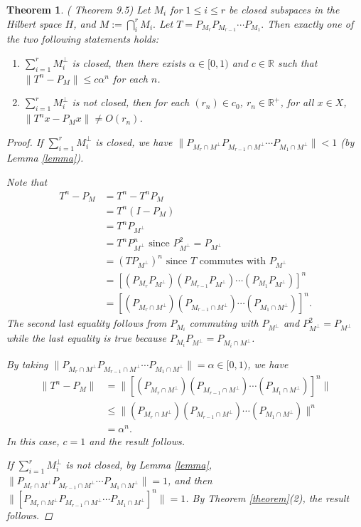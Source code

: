 \documentclass[11pt, a4paper]{amsart}
\newtheorem{theorem}{Theorem}
\begin{document}
\begin{theorem}(\cite{DH15} Theorem 9.5)
Let $M_i$ for $1\leq i\leq r$ be closed subspaces in the Hilbert space $H$, and $M:=\bigcap_{i}^r M_i.$ Let $T=P_{M_r}P_{M_{r-1}}\cdots P_{M_1}.$ Then exactly one of the two following statements holds:
\begin{enumerate}
\item $\sum_{i=1}^r M_{i}^{\perp}$ is closed, then there exists $\alpha\in [0,1)$ and $c\in \mathbb{R}$ such that $\|T^n-P_{M}\|\leq c\alpha^n$ for each $n$.\\
\item $\sum_{i=1}^r M_{i}^{\perp}$ is not closed, then for each $(r_n)\in c_0$, $r_n\in\mathbb{R}^{+}$, for all $x\in X$, $\|T^n x-P_{M}x\|\neq O(r_n)$.
\end{enumerate}
\begin{proof}

If $\sum_{i=1}^r M_{i}^{\perp}$ is closed, we have $\|P_{M_r\cap M^{\perp}}P_{M_{r-1}\cap M^{\perp}}\cdots P_{M_1\cap M^{\perp}}\|<1$ (by \emph{Lemma \ref{lemma}}).

Note that 
\begin{align*}
T^n-P_{M}&=T^n-T^nP_M \\
{}&=T^n(I-P_{M})\\
{}&=T^n P_{M^{\perp}}\\
{}&=T^n P_{M^{\perp}}^n \mbox{ since } P_{M^{\perp}}^2=P_{M^{\perp}}\\
{}&=(TP_{M^{\perp}})^n \mbox{ since } T \mbox{ commutes with } P_{M^{\perp}}\\
{}&=[(P_{M_r}P_{M^{\perp}})(P_{M_{r-1}}P_{M^{\perp}})\cdots (P_{M_1}P_{M^{\perp}})]^n\\
{}&=[(P_{M_r\cap M^{\perp}})(P_{M_{r-1}\cap M^{\perp}})\cdots (P_{M_1\cap M^{\perp}})]^n.
\end{align*}
The second last equality follows from $P_{M_i}$ commuting with $P_{M^{\perp}}$ and $P_{M^{\perp}}^2=P_{M^{\perp}}$ while the last equality is true because $P_{M_i}P_{M^{\perp}}=P_{M_i\cap M^{\perp}}$.

By taking $\|P_{M_r\cap M^{\perp}}P_{M_{r-1}\cap M^{\perp}}\cdots P_{M_1\cap M^{\perp}}\|=\alpha\in [0,1)$, we have 
\begin{align*}
\|T^n-P_{M}\|&=\|[(P_{M_r\cap M^{\perp}})(P_{M_{r-1}\cap M^{\perp}})\cdots (P_{M_1\cap M^{\perp}})]^n\|\\
{}&\leq \|(P_{M_r\cap M^{\perp}})(P_{M_{r-1}\cap M^{\perp}})\cdots (P_{M_1\cap M^{\perp}})\|^n\\
{}&=\alpha^n.
\end{align*}
In this case, $c=1$ and the result follows.
\par
If $\sum_{i=1}^r M_{i}^{\perp}$ is not closed, by \emph{Lemma} \ref{lemma}, $\|P_{M_r\cap M^{\perp}}P_{M_{r-1}\cap M^{\perp}}\cdots P_{M_1\cap M^{\perp}}\|=1$, and then $\|[P_{M_r\cap M^{\perp}}P_{M_{r-1}\cap M^{\perp}}\cdots P_{M_1\cap M^{\perp}}]^n\|=1$. By \emph{Theorem \ref{theorem}(2)}, the result follows.
\end{proof}
\end{theorem}
\end{document}
